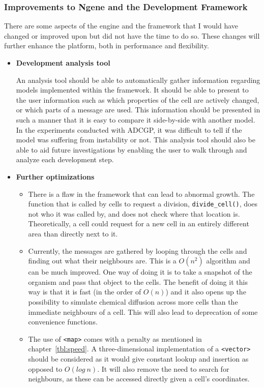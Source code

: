 \subsubsection{Improvements to Ngene and the Development Framework}
\label{sec:improvements}
There are some aspects of the engine and the framework that I would have changed or improved upon but did not have the time to do so. These changes will further enhance the platform, both in performance and flexibility.

\begin{itemize}
	\item\textbf{Development analysis tool}

	An analysis tool should be able to automatically gather information regarding models implemented within the framework. It should be able to present to the user information such as which properties of the cell are actively changed, or which parts of a message are used. This information should be presented in such a manner that it is easy to compare it side-by-side with another model. In the experiments conducted with ADCGP, it was difficult to tell if the model was suffering from instability or not. This analysis tool should also be able to aid future investigations by enabling the user to walk through and analyze each development step.

	\item\textbf{Further optimizations}
		\begin{itemize}
			\item There is a flaw in the framework that can lead to abnormal growth. The function that is called by cells to request a division, \texttt{divide\_cell()}, does not who it was called by, and does not check where that location is. Theoretically, a cell could request for a new cell in an entirely different area than directly next to it.

			\item Currently, the messages are gathered by looping through the cells and finding out what their neighbours are. This is a $O(n^{2})$ algorithm and can be much improved. One way of doing it is to take a snapshot of the organism and pass that object to the cells. The benefit of doing it this way is that it is fast (in the order of $O(n)$) and it also opens up the possibility to simulate chemical diffusion across more cells than the immediate neighbours of a cell. This will also lead to deprecation of some convenience functions.

			\item The use of \texttt{<map>} comes with a penalty as mentioned in chapter~\ref{tbl:speed}. A three-dimensional implementation of a \texttt{<vector>} should be considered as it would give constant lookup and insertion as opposed to $O(log~n)$. It will also remove the need to search for neighbours, as these can be accessed directly given a cell's coordinates.


\end{itemize}
\end{itemize}
